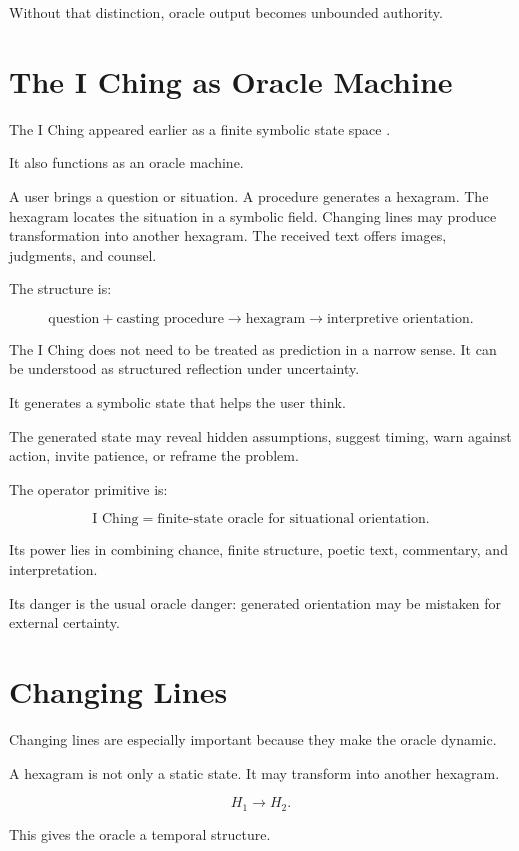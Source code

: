 \documentclass[11pt]{book}
\begin{document}
Without that distinction, oracle output becomes unbounded authority.

\section{The I Ching as Oracle Machine}

The I Ching appeared earlier as a finite symbolic state space \cite{WilhelmBaynes1967IChing,Shaughnessy1996IChing,Loewe1994DivinationMythologyMonarchy}.

It also functions as an oracle machine.

A user brings a question or situation. A procedure generates a hexagram. The hexagram locates the situation in a symbolic field. Changing lines may produce transformation into another hexagram. The received text offers images, judgments, and counsel.

The structure is:

\[
\text{question}
+
\text{casting procedure}
\rightarrow
\text{hexagram}
\rightarrow
\text{interpretive orientation}.
\]

The I Ching does not need to be treated as prediction in a narrow sense. It can be understood as structured reflection under uncertainty.

It generates a symbolic state that helps the user think.

The generated state may reveal hidden assumptions, suggest timing, warn against action, invite patience, or reframe the problem.

The operator primitive is:

\[
\text{I Ching} = \text{finite-state oracle for situational orientation}.
\]

Its power lies in combining chance, finite structure, poetic text, commentary, and interpretation.

Its danger is the usual oracle danger: generated orientation may be mistaken for external certainty.

\section{Changing Lines}

Changing lines are especially important because they make the oracle dynamic.

A hexagram is not only a static state. It may transform into another hexagram.

\[
H_1 \rightarrow H_2.
\]

This gives the oracle a temporal structure.
\end{document}
